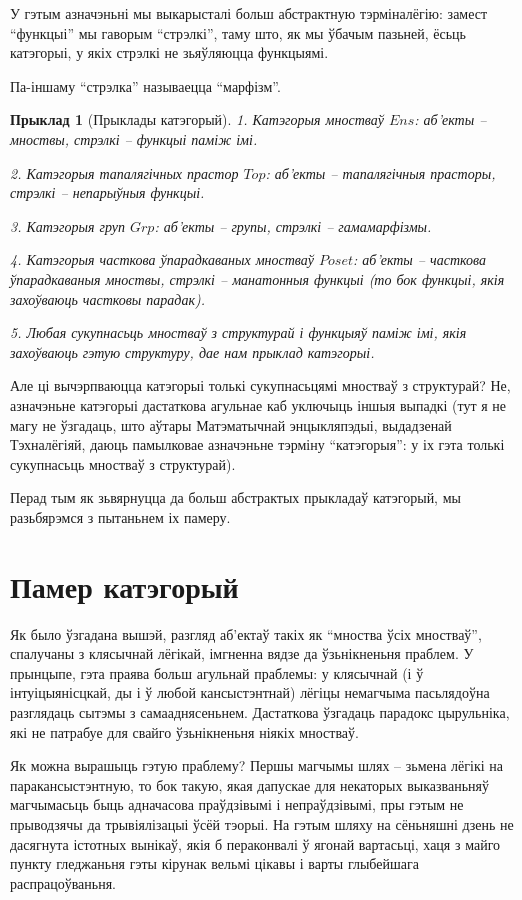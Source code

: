 \documentclass[a4paper,12pt]{book}
\newtheorem{example}{Прыклад}[section]
\begin{document}
У гэтым азначэньні мы выкарысталі больш абстрактную тэрміналёгію:
замест ``функцыі'' мы гаворым ``стрэлкі'', таму што, як мы ўбачым
пазьней, ёсьць катэгорыі, у якіх стрэлкі не зьяўляюцца функцыямі.

Па-іншаму ``стрэлка'' называецца ``марфізм''.

\begin{example}[Прыклады катэгорый]
  1. Катэгорыя мностваў $Ens$: аб'екты -- мноствы, стрэлкі -- функцыі
  паміж імі.

  2. Катэгорыя тапалягічных прастор $Top$: аб'екты -- тапалягічныя
  прасторы, стрэлкі -- непарыўныя функцыі.

  3. Катэгорыя груп $Grp$: аб'екты -- групы, стрэлкі -- гамамарфізмы.

  4. Катэгорыя часткова ўпарадкаваных мностваў $Poset$: аб'екты --
  часткова ўпарадкаваныя мноствы, стрэлкі -- манатонныя функцыі (то
  бок функцыі, якія захоўваюць частковы парадак).

  5. Любая сукупнасьць мностваў з структурай і функцыяў паміж імі,
  якія захоўваюць гэтую структуру, дае нам прыклад катэгорыі.
\end{example}

Але ці вычэрпваюцца катэгорыі толькі сукупнасьцямі мностваў з
структурай? Не, азначэньне катэгорыі дастаткова агульнае каб уключыць
іншыя выпадкі (тут я не магу не ўзгадаць, што аўтары Матэматычнай
энцыкляпэдыі, выдадзенай Тэхналёгіяй, даюць памылковае азначэньне
тэрміну ``катэгорыя'': у іх гэта толькі сукупнасьць мностваў з
структурай).

Перад тым як зьвярнуцца да больш абстрактых прыкладаў катэгорый, мы
разьбярэмся з пытаньнем іх памеру.

\section{Памер катэгорый}

Як было ўзгадана вышэй, разгляд аб'ектаў такіх як ``мноства ўсіх
мностваў'', спалучаны з клясычнай лёгікай, імгненна вядзе да
ўзьнікненьня праблем. У прынцыпе, гэта праява больш агульнай праблемы:
у клясычнай (і ў інтуіцыянісцкай, ды і ў любой кансыстэнтнай) лёгіцы
немагчыма пасьлядоўна разглядаць сытэмы з самааднясеньнем. Дастаткова
ўзгадаць парадокс цырульніка, які не патрабуе для свайго ўзьнікненьня
ніякіх мностваў.

Як можна вырашыць гэтую праблему? Першы магчымы шлях -- зьмена лёгікі
на паракансыстэнтную, то бок такую, якая дапускае для некаторых
выказваньняў магчымасьць быць адначасова праўдзівымі і непраўдзівымі,
пры гэтым не прыводзячы да трывіялізацыі ўсёй тэорыі. На гэтым шляху
на сёньняшні дзень не дасягнута істотных вынікаў, якія б пераконвалі ў
ягонай вартасьці, хаця з майго пункту гледжаньня гэты кірунак вельмі
цікавы і варты глыбейшага распрацоўваньня.
\end{document}
